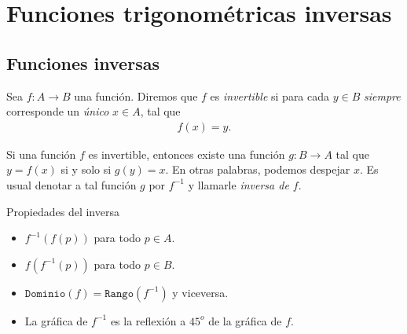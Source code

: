 \section{Funciones trigonométricas inversas}

\subsection{Funciones inversas}
{}
	Sea $f:A\to B$ una función. Diremos que $f$ es \emph{invertible} si para cada $y\in B$ \emph{siempre} corresponde un \emph{único} $x\in A$, tal que
	\begin{align*}
		f(x)=y.
	\end{align*}

{}
	Si una función $f$ es invertible, entonces existe una función $g:B\to A$ tal que $y=f(x)$ si y solo si $g(y)=x$.  En otras palabras, podemos despejar $x$.  Es usual denotar a tal función $g$ por $f^{-1}$ y llamarle \emph{inversa de $f$}.

{Propiedades del inversa}
	\begin{itemize}
		\item $f^{-1}\left( f(p) \right)$ para todo $p\in A.$ 
		\item $f\left( f^{-1}(p) \right)$ para todo $p\in B.$ 
		\item $\texttt{Dominio}(f)=\texttt{Rango}(f^{-1})$ y viceversa. 
		\item La gráfica de $f^{-1}$ es la reflexión a $45^{o}$ de la gráfica de $f$.
	\end{itemize}
	

